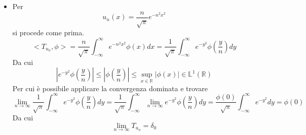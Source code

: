 \documentclass[twoside]{article}
\begin{document}
\begin{itemize}
    \item Per 
    \begin{equation}
        u_n(x)=\frac{n}{\sqrt{\pi}}e^{-n^2x^2}
    \end{equation}
    si procede come prima.
    \begin{equation}
        <T_{u_n},\phi>=\frac{n}{\sqrt{\pi}}\int_{-\infty}^\infty e^{-n^2x^2}\phi(x)dx=\frac{1}{\sqrt{\pi}}\int_{-\infty}^\infty e^{-y^2}\phi\left( \frac{y}{n} \right)dy
    \end{equation}
    Da cui
    \begin{equation}
        \left| e^{-y^2}\phi\left(\frac{y}{n}\right) \right|\le \left|\phi\left(\frac{y}{n}\right)\right|\le \sup_{x\in\mathds{R}}|\phi(x)|\in \mathds{L}^1(\mathds{R})
    \end{equation}
    Per cui è possibile applicare la convergenza dominata e trovare
    \begin{equation*}
        \lim_{n\to\infty}\frac{1}{\sqrt{\pi}}\int_{-\infty}^\infty e^{-y^2}\phi\left( \frac{y}{n} \right)dy=\frac{1}{\sqrt{\pi}}\int_{-\infty}^\infty \lim_{n\to \infty} e^{-y^2}\phi\left( \frac{y}{n} \right)dy=\frac{\phi(0)}{\sqrt{\pi}}\int_{-\infty}^\infty e^{-y^2}dy=\phi(0)
    \end{equation*}
    Da cui
    \begin{equation}
        \lim_{n\to \infty}T_{u_n}=\delta_0
    \end{equation}
    
    
    
    
    
\end{itemize}
\end{document}
